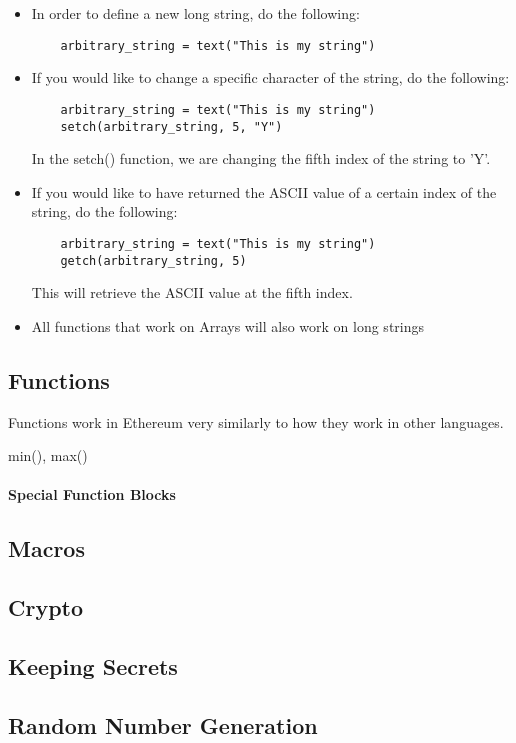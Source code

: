 \documentclass[12pt]{article}
\begin{document}
\begin{itemize}
\item In order to define a new long string, do the following:
	\begin{lstlisting}
	arbitrary_string = text("This is my string")
	\end{lstlisting}
\item If you would like to change a specific character of the string, do the following:
	\begin{lstlisting}
	arbitrary_string = text("This is my string")
	setch(arbitrary_string, 5, "Y")
	\end{lstlisting}
	In the setch() function, we are changing the fifth index of the string to 'Y'.
\item If you would like to have returned the ASCII value of a certain index of the string, do the following:
	\begin{lstlisting}
	arbitrary_string = text("This is my string")
	getch(arbitrary_string, 5)
	\end{lstlisting}
	This will retrieve the ASCII value at the fifth index.
\item All functions that work on Arrays will also work on long strings
\end{itemize}
	
\subsection{Functions}
Functions work in Ethereum very similarly to how they work in other languages. 

min(), max()
\paragraph{Special Function Blocks}



\subsection{Macros}



\subsection{Crypto}



\subsection{Keeping Secrets}



\subsection{Random Number Generation}

\end{document}
